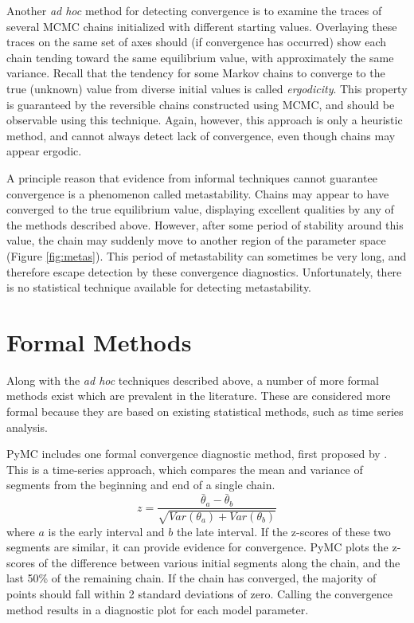 \documentclass[]{book}
\begin{document}
Another \emph{ad hoc} method for detecting convergence is to examine the traces of several MCMC chains initialized with different starting values. Overlaying these traces on the same set of axes should (if convergence has occurred) show each chain tending toward the same equilibrium value, with approximately the same variance. Recall that the tendency for some Markov chains to converge to the true (unknown) value from diverse initial values is called \emph{ergodicity}. This property is guaranteed by the reversible chains constructed using MCMC, and should be observable using this technique. Again, however, this approach is only a heuristic method, and cannot always detect lack of convergence, even though chains may appear ergodic.

A principle reason that evidence from informal techniques cannot guarantee convergence is a phenomenon called metastability. Chains may appear to have converged to the true equilibrium value, displaying excellent qualities by any of the methods described above. However, after some period of stability around this value, the chain may suddenly move to another region of the parameter space (Figure \ref{fig:metas}). This period of metastability can sometimes be very long, and therefore escape detection by these convergence diagnostics. Unfortunately, there is no statistical technique available for detecting metastability.

\section*{Formal Methods}

Along with the \emph{ad hoc} techniques described above, a number of more formal methods exist which are prevalent in the literature. These are considered more formal because they are based on existing statistical methods, such as time series analysis.

PyMC includes one formal convergence diagnostic method, first proposed by \citet{Geweke:1992gm}. This is a time-series approach, which compares the mean and variance of segments from the beginning and end of a single chain. 
\begin{equation}
z = \frac{\bar{\theta}_a - \bar{\theta}_b}{\sqrt{Var(\theta_a) + Var(\theta_b)}}
\end{equation}
where $a$ is the early interval and $b$ the late interval. If the z-scores of these two segments are similar, it can provide evidence for convergence. PyMC plots the z-scores of the difference between various initial segments along the chain, and the last 50\% of the remaining chain. If the chain has converged, the majority of points should fall within 2 standard deviations of zero. Calling the convergence method results in a diagnostic plot for each model parameter.
\end{document}
